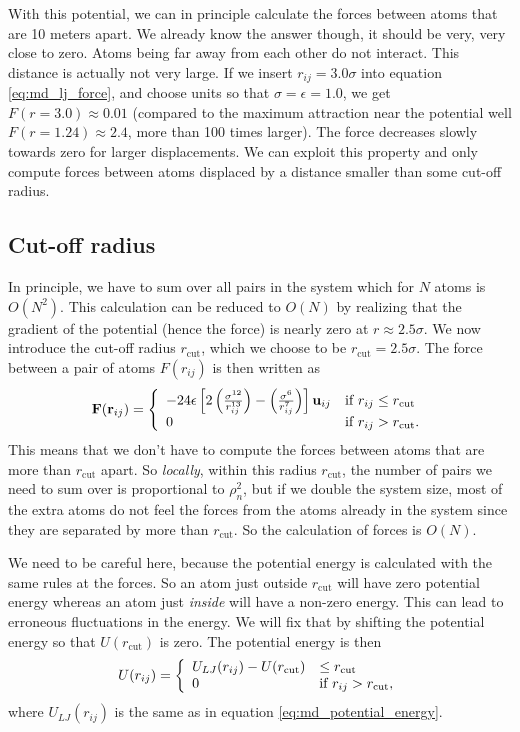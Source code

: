 With this potential, we can in principle calculate the forces between atoms that are 10 meters apart. We already know the answer though, it should be very, very close to zero. Atoms being far away from each other do not interact. This distance is actually not very large. If we insert $r_{ij} = 3.0\sigma$ into equation \eqref{eq:md_lj_force}, and choose units so that $\sigma = \epsilon = 1.0$, we get $F(r=3.0) \approx 0.01$ (compared to the maximum attraction near the potential well $F(r = 1.24) \approx 2.4$, more than 100 times larger). The force decreases slowly towards zero for larger displacements. We can exploit this property and only compute forces between atoms displaced by a distance smaller than some cut-off radius.
\subsection{Cut-off radius}
\label{sec:md_implementation_two_body_forces}
In principle, we have to sum over all pairs in the system which for $N$ atoms is $O(N^2)$. This calculation can be reduced to $O(N)$ by realizing that the gradient of the potential (hence the force) is nearly zero at $r \approx 2.5\sigma$. We now introduce the cut-off radius $r_\text{cut}$, which we choose to be $r_\text{cut} = 2.5\sigma$. The force between a pair of atoms $F(r_{ij})$ is then written as
\begin{align}
	\vec F(\vec r_{ij}) = \left\{
	\begin{array}{l l}
		-24\epsilon\left[2\left(\frac{\sigma^{12}}{r_{ij}^{13}}\right) - \left(\frac{\sigma^6}{r_{ij}^7}\right)\right]\vec u_{ij} & \text{if } r_{ij} \leq r_\text{cut}\\
		0 & \text{if } r_{ij} > r_\text{cut}.
	\end{array}\right .
\end{align}
This means that we don't have to compute the forces between atoms that are more than $r_\text{cut}$ apart. So \textit{locally}, within this radius $r_\text{cut}$, the number of pairs we need to sum over is proportional to $\rho_n^2$, but if we double the system size, most of the extra atoms do not feel the forces from the atoms already in the system since they are separated by more than $r_\text{cut}$. So the calculation of forces is $O(N)$.

We need to be careful here, because the potential energy is calculated with the same rules at the forces. So an atom just outside $r_\text{cut}$ will have zero potential energy whereas an atom just \textit{inside} will have a non-zero energy. This can lead to erroneous fluctuations in the energy. We will fix that by shifting the potential energy so that $U(r_\text{cut})$ is zero. The potential energy is then 
\begin{align}
	U(r_{ij}) = \left\{
	\begin{array}{l l}
		 U_{LJ}(r_{ij}) - U(r_\text{cut}) & \leq r_\text{cut}\\
		0 & \text{if } r_{ij} > r_\text{cut},
	\end{array}\right .
\end{align}
where $U_{LJ}(r_{ij})$ is the same as in equation \ref{eq:md_potential_energy}. 